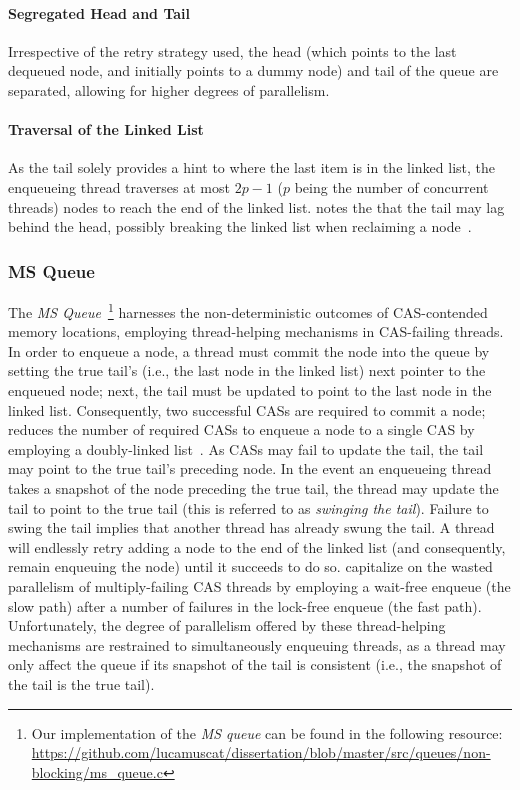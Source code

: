 \paragraph{Segregated Head and Tail}
Irrespective of the retry strategy used, the head (which points to the last
dequeued node, and initially points to a dummy node) and tail of the queue are
separated, allowing for higher degrees of parallelism.

\paragraph{Traversal of the Linked List}
As the tail solely provides a hint to where the last item is in the linked list,
the enqueueing thread traverses at most $2p-1$ ($p$ being the number of
concurrent threads) nodes to reach the end of the linked list. \citeauthor{michael1996simple} notes the
that the tail may lag behind the head, possibly breaking the linked list when
reclaiming a node~\citep{michael1996simple}.

\subsubsection{MS Queue}
The \emph{MS Queue}~\citep{michael1996simple}\footnote{Our implementation of
the \emph{MS queue} can be found in the following resource:
\url{https://github.com/lucamuscat/dissertation/blob/master/src/queues/non-blocking/ms_queue.c}}
harnesses the non-deterministic outcomes of CAS-contended memory locations,
employing thread-helping mechanisms in CAS-failing threads. In order to enqueue
a node, a thread must commit the node into the queue by setting the true tail's
(i.e., the last node in the linked list) next pointer to the enqueued node;
next, the tail must be updated to point to the last node in the linked list.
Consequently, two successful CASs are required to commit a node;
\citeauthor{ladan2008optimistic} reduces the number of required CASs to enqueue
a node to a single CAS by employing a doubly-linked
list~\citep{ladan2008optimistic}. As CASs may fail to update the tail, the tail
may point to the true tail's preceding node. In the event an enqueueing thread
takes a snapshot of the node preceding the true tail, the thread may update the
tail to point to the true tail (this is referred to as \emph{swinging the
tail}). Failure to swing the tail implies that another thread has already swung
the tail. A thread will endlessly retry adding a node to the end of the linked
list (and consequently, remain enqueuing the node) until it succeeds to do so.
\citeauthor{kogan2012methodology} capitalize on the wasted parallelism of
multiply-failing CAS threads by employing a wait-free enqueue (the slow path)
after a number of failures in the lock-free enqueue (the fast path).
Unfortunately, the degree of parallelism offered by these thread-helping
mechanisms are restrained to simultaneously enqueuing threads, as a thread may
only affect the queue if its snapshot of the tail is consistent (i.e., the
snapshot of the tail is the true tail). 

